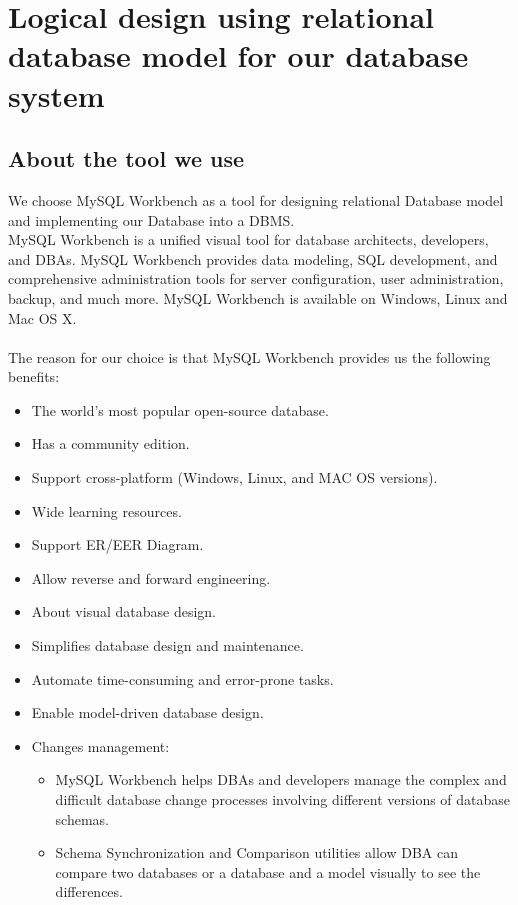 \documentclass[12pt,a4paper]{article}
\begin{document}
\section{Logical design using relational database model for our database system}
\subsection{About the tool we use}
\indent We choose MySQL Workbench as a tool for designing relational Database model and implementing our Database into a DBMS.\\
\indent MySQL Workbench is a unified visual tool for database architects, developers, and DBAs. MySQL Workbench provides data modeling, SQL development, and comprehensive administration tools for server configuration, user administration, backup, and much more. MySQL Workbench is available on Windows, Linux and Mac OS X.\\\\
\indent The reason for our choice is that MySQL Workbench provides us the following benefits:
\begin{itemize}
    \item The world’s most popular open-source database.
    \item Has a community edition.
    \item Support cross-platform (Windows, Linux, and MAC OS versions).
    \item Wide learning resources.
    \item Support ER/EER Diagram.
    \item Allow reverse and forward engineering.
    \item About visual database design.
    \item Simplifies database design and maintenance.
    \item Automate time-consuming and error-prone tasks.
    \item Enable model-driven database design.
    \item Changes management:
    \begin{itemize}
    \item MySQL Workbench helps DBAs and developers manage the complex and difficult database change processes involving different versions of database schemas.
    \item Schema Synchronization and Comparison utilities allow DBA can compare two databases or a database and a model visually to see the differences.  
    \end{itemize}
\end{itemize}
\end{document}
